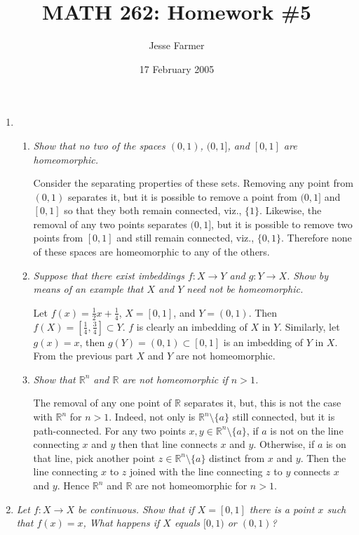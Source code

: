 \documentclass[10pt]{article}
\title{MATH 262: Homework \#5}
\author{Jesse Farmer}
\date{17 February 2005}
\newcommand{\R}{\mathbb{R}}
\begin{document}
\maketitle
\begin{enumerate}

\item
\begin{enumerate}
\item \emph{Show that no two of the spaces $(0,1)$, $(0,1]$, and $[0,1]$ are homeomorphic.}

Consider the separating properties of these sets.  Removing any point from $(0,1)$ separates it, but it is possible to remove a point from $(0,1]$ and $[0,1]$ so that they both remain connected, viz., $\{1\}$.  Likewise, the removal of any two points separates $(0,1]$, but it is possible to remove two points from $[0,1]$ and still remain connected, viz., $\{0,1\}$.  Therefore none of these spaces are homeomorphic to any of the others.

\item \emph{Suppose that there exist imbeddings $f: X \rightarrow Y$ and $g: Y \rightarrow X$.  Show by means of an example that $X$ and $Y$ need not be homeomorphic.}

Let $f(x) = \frac{1}{2}x + \frac{1}{4}$, $X = [0,1]$, and $Y = (0,1)$.  Then $f(X) = \left[\frac{1}{4}, \frac{3}{4}\right] \subset Y$.  $f$ is clearly an imbedding of $X$ in $Y$.  Similarly, let $g(x) = x$, then $g(Y) = (0,1) \subset [0,1]$ is an imbedding of $Y$ in $X$.  From the previous part $X$ and $Y$ are not homeomorphic.

\item \emph{Show that $\R^n$ and $\R$ are not homeomorphic if $n > 1$.}

The removal of any one point of $\R$ separates it, but, this is not the case with $\R^n$ for $n > 1$.  Indeed, not only is $\R^n \setminus \{a\}$ still connected, but it is path-connected.  For any two points $x,y \in \R^n \setminus \{a\}$, if $a$ is not on the line connecting $x$ and $y$ then that line connects $x$ and $y$.  Otherwise, if $a$ is on that line, pick another point $z \in \R^n \setminus \{a\}$ distinct from $x$ and $y$.  Then the line connecting $x$ to $z$ joined with the line connecting $z$ to $y$ connects $x$ and $y$.  Hence $\R^n$ and $\R$ are not homeomorphic for $n > 1$.

\end{enumerate}

\item \emph{Let $f: X \rightarrow X$ be continuous.  Show that if $X = [0,1]$ there is a point $x$ such that $f(x) = x$,  What happens if $X$ equals $[0,1)$ or $(0,1)$?}


\end{enumerate}
\end{document}
